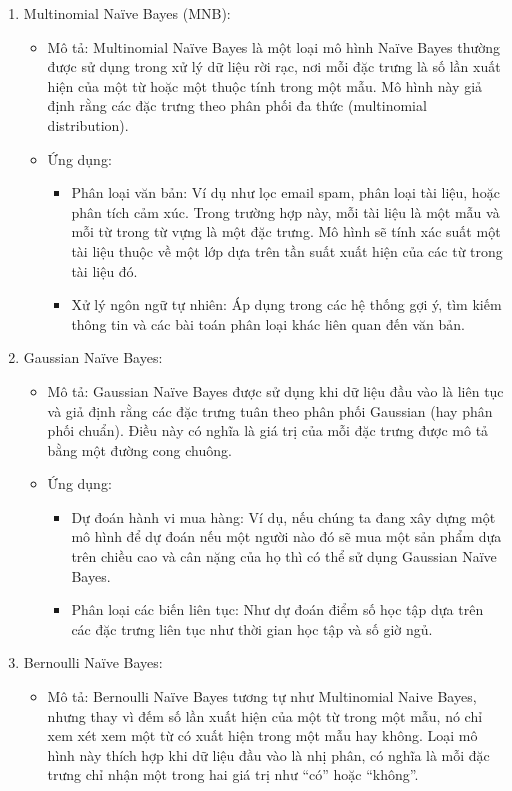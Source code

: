 \begin{enumerate}
    \item Multinomial Naïve Bayes (MNB):
    \begin{itemize}
        \item Mô tả: Multinomial Naïve Bayes là một loại mô hình Naïve Bayes thường được sử dụng trong xử lý dữ liệu rời rạc, nơi mỗi đặc trưng là số lần xuất hiện của một từ hoặc một thuộc tính trong một mẫu. Mô hình này giả định rằng các đặc trưng theo phân phối đa thức (multinomial distribution).
        \item Ứng dụng:
        \begin{itemize}
            \item Phân loại văn bản: Ví dụ như lọc email spam, phân loại tài liệu, hoặc phân tích cảm xúc. Trong trường hợp này, mỗi tài liệu là một mẫu và mỗi từ trong từ vựng là một đặc trưng. Mô hình sẽ tính xác suất một tài liệu thuộc về một lớp dựa trên tần suất xuất hiện của các từ trong tài liệu đó.
            \item Xử lý ngôn ngữ tự nhiên: Áp dụng trong các hệ thống gợi ý, tìm kiếm thông tin và các bài toán phân loại khác liên quan đến văn bản.
        \end{itemize}
    \end{itemize}
\item Gaussian Naïve Bayes:
\begin{itemize}
    \item Mô tả: Gaussian Naïve Bayes được sử dụng khi dữ liệu đầu vào là liên tục và giả định rằng các đặc trưng tuân theo phân phối Gaussian (hay phân phối chuẩn). Điều này có nghĩa là giá trị của mỗi đặc trưng được mô tả bằng một đường cong chuông.
    \item Ứng dụng:
    \begin{itemize}
        \item Dự đoán hành vi mua hàng: Ví dụ, nếu chúng ta đang xây dựng một mô hình để dự đoán nếu một người nào đó sẽ mua một sản phẩm dựa trên chiều cao và cân nặng của họ thì có thể sử dụng Gaussian Naïve Bayes.
        \item Phân loại các biến liên tục: Như dự đoán điểm số học tập dựa trên các đặc trưng liên tục như thời gian học tập và số giờ ngủ.
    \end{itemize}
\end{itemize}
\item Bernoulli Naïve Bayes:
\begin{itemize}
    \item Mô tả: Bernoulli Naïve Bayes tương tự như Multinomial Naive Bayes, nhưng thay vì đếm số lần xuất hiện của một từ trong một mẫu, nó chỉ xem xét xem một từ có xuất hiện trong một mẫu hay không. Loại mô hình này thích hợp khi dữ liệu đầu vào là nhị phân, có nghĩa là mỗi đặc trưng chỉ nhận một trong hai giá trị như “có” hoặc “không”.

\end{itemize}
\end{enumerate}
